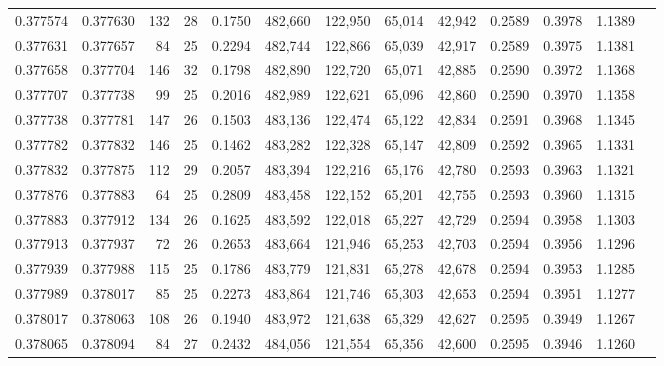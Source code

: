 \begin{tabular}{rrrrrrrrrrrrr}
0.377574 & 0.377630 &   132 &  28 &                                     0.1750 & 482,660 & 122,950 &  65,014 &  42,942 & 0.2589 & 0.3978 & 1.1389 \\
0.377631 & 0.377657 &    84 &  25 &                                     0.2294 & 482,744 & 122,866 &  65,039 &  42,917 & 0.2589 & 0.3975 & 1.1381 \\
0.377658 & 0.377704 &   146 &  32 &                                     0.1798 & 482,890 & 122,720 &  65,071 &  42,885 & 0.2590 & 0.3972 & 1.1368 \\
0.377707 & 0.377738 &    99 &  25 &                                     0.2016 & 482,989 & 122,621 &  65,096 &  42,860 & 0.2590 & 0.3970 & 1.1358 \\
0.377738 & 0.377781 &   147 &  26 &                                     0.1503 & 483,136 & 122,474 &  65,122 &  42,834 & 0.2591 & 0.3968 & 1.1345 \\
0.377782 & 0.377832 &   146 &  25 &                                     0.1462 & 483,282 & 122,328 &  65,147 &  42,809 & 0.2592 & 0.3965 & 1.1331 \\
0.377832 & 0.377875 &   112 &  29 &                                     0.2057 & 483,394 & 122,216 &  65,176 &  42,780 & 0.2593 & 0.3963 & 1.1321 \\
0.377876 & 0.377883 &    64 &  25 &                                     0.2809 & 483,458 & 122,152 &  65,201 &  42,755 & 0.2593 & 0.3960 & 1.1315 \\
0.377883 & 0.377912 &   134 &  26 &                                     0.1625 & 483,592 & 122,018 &  65,227 &  42,729 & 0.2594 & 0.3958 & 1.1303 \\
0.377913 & 0.377937 &    72 &  26 &                                     0.2653 & 483,664 & 121,946 &  65,253 &  42,703 & 0.2594 & 0.3956 & 1.1296 \\
0.377939 & 0.377988 &   115 &  25 &                                     0.1786 & 483,779 & 121,831 &  65,278 &  42,678 & 0.2594 & 0.3953 & 1.1285 \\
0.377989 & 0.378017 &    85 &  25 &                                     0.2273 & 483,864 & 121,746 &  65,303 &  42,653 & 0.2594 & 0.3951 & 1.1277 \\
0.378017 & 0.378063 &   108 &  26 &                                     0.1940 & 483,972 & 121,638 &  65,329 &  42,627 & 0.2595 & 0.3949 & 1.1267 \\
0.378065 & 0.378094 &    84 &  27 &                                     0.2432 & 484,056 & 121,554 &  65,356 &  42,600 & 0.2595 & 0.3946 & 1.1260 \\

\end{tabular}
